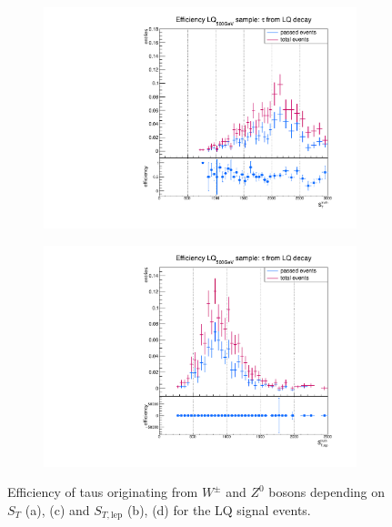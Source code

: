 \begin{figure}
\begin{subfigure}[t]{0.49\textwidth}
                \label{Dividedprompt:signal:STlepLQ75}
                \end{subfigure}
                \begin{subfigure}[t]{0.49\textwidth}
                \includegraphics[width=\textwidth]{figures/plots/LQ76/Divided_fromLQST.pdf}
                \label{Dividedprompt:signal:STLQ76}
                \end{subfigure}
                \begin{subfigure}[t]{0.49\textwidth}
                \includegraphics[width=\textwidth]{figures/plots/LQ76/Divided_fromLQSTlep.pdf}
                \label{Dividedprompt:signal:STlepLQ76}
                \end{subfigure}
\caption[Efficiency of taus originating from $W^\pm$ and $Z^0$ bosons for the LQ signal events.]{Efficiency of taus originating from $W^\pm$ and $Z^0$ bosons depending on $S_{T}$ (a), (c) and $S_{T,\text{lep}}$ (b), (d) for the LQ signal events.}
\label{Dividedprompt:signal:STgedöns}
\end{figure}
